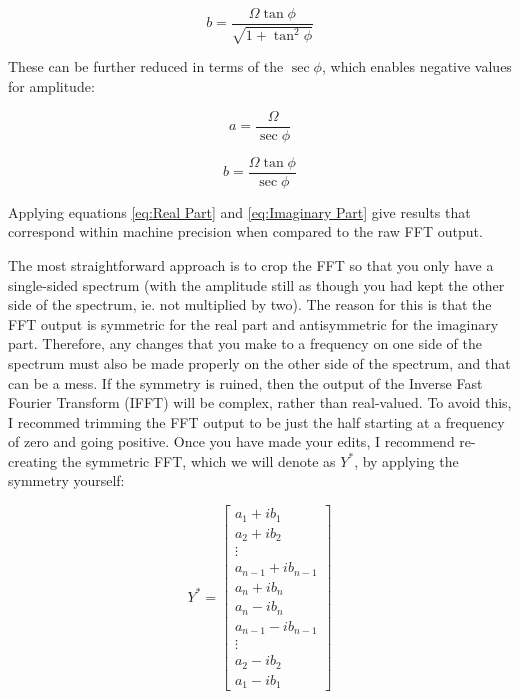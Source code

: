 \begin{equation}
    b = \frac{\Omega \tan{\phi}}{\sqrt{1 + \tan^2{\phi}}}
\end{equation}

These can be further reduced in terms of the $\sec{\phi}$, which enables negative values for amplitude:

\begin{equation} \label{eq:Real Part}
    \boxed{a = \frac{\Omega}{\sec{\phi}}}
\end{equation}

\begin{equation} \label{eq:Imaginary Part}
    \boxed{b = \frac{\Omega \tan{\phi}}{\sec{\phi}}}
\end{equation}

Applying equations \ref{eq:Real Part} and \ref{eq:Imaginary Part} give results that correspond within machine precision when compared to the raw FFT output.

The most straightforward approach is to crop the FFT so that you only have a single-sided spectrum (with the amplitude still as though you had kept the other side of the spectrum, ie. not multiplied by two).
The reason for this is that the FFT output is symmetric for the real part and antisymmetric for the imaginary part.
Therefore, any changes that you make to a frequency on one side of the spectrum must also be made properly on the other side of the spectrum, and that can be a mess.
If the symmetry is ruined, then the output of the Inverse Fast Fourier Transform (IFFT) will be complex, rather than real-valued.
To avoid this, I recommed trimming the FFT output to be just the half starting at a frequency of zero and going positive.
Once you have made your edits, I recommend re-creating the symmetric FFT, which we will denote as $Y^*$, by applying the symmetry yourself:

\begin{equation} \label{eq:Creating Symmetric FFT from Single-sided FFT}
    Y^* = 
    \begin{bmatrix}
        a_1 + i b_1 \\
        a_2 + i b_2 \\
        \vdots \\
        a_{n-1} + i b_{n-1} \\
        a_n + i b_n \\
        a_n - i b_n \\
        a_{n-1} - i b_{n-1} \\
        \vdots \\
        a_2 - i b_2 \\
        a_1 - i b_1
    \end{bmatrix}
\end{equation}

